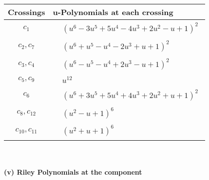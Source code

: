 \documentclass[1p]{elsarticle_modified}
\theoremstyle{definition}
\begin{document}
\begin{tabular}{m{50pt}|m{274pt}}
Crossings & \hspace{64pt}u-Polynomials at each crossing \\
\hline $$\begin{aligned}c_{1}\end{aligned}$$&$\begin{aligned}
&(u^6-3 u^5+5 u^4-4 u^3+2 u^2- u+1)^2
\end{aligned}$\\
\hline $$\begin{aligned}c_{2},c_{7}\end{aligned}$$&$\begin{aligned}
&(u^6+u^5- u^4-2 u^3+u+1)^2
\end{aligned}$\\
\hline $$\begin{aligned}c_{3},c_{4}\end{aligned}$$&$\begin{aligned}
&(u^6- u^5- u^4+2 u^3- u+1)^2
\end{aligned}$\\
\hline $$\begin{aligned}c_{5},c_{9}\end{aligned}$$&$\begin{aligned}
&u^{12}
\end{aligned}$\\
\hline $$\begin{aligned}c_{6}\end{aligned}$$&$\begin{aligned}
&(u^6+3 u^5+5 u^4+4 u^3+2 u^2+u+1)^2
\end{aligned}$\\
\hline $$\begin{aligned}c_{8},c_{12}\end{aligned}$$&$\begin{aligned}
&(u^2- u+1)^6
\end{aligned}$\\
\hline $$\begin{aligned}c_{10},c_{11}\end{aligned}$$&$\begin{aligned}
&(u^2+u+1)^6
\end{aligned}$\\
\hline
\end{tabular}\\~\\
\newpage\renewcommand{\arraystretch}{1}
\flushleft \textbf{(v) Riley Polynomials at the component}\newline \\
\end{document}
